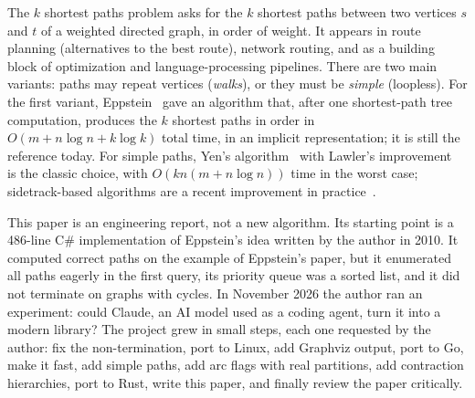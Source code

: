 \documentclass[11pt,a4paper]{article}
\newcommand{\cs}{C\#}
\begin{document}
The $k$ shortest paths problem asks for the $k$ shortest paths between two vertices $s$ and $t$ of a weighted
directed graph, in order of weight. It appears in route planning (alternatives to the best route), network routing,
and as a building block of optimization and language-processing pipelines. There are two main variants: paths may
repeat vertices (\emph{walks}), or they must be \emph{simple} (loopless). For the first variant,
Eppstein~\cite{eppstein1998} gave an algorithm that, after one shortest-path tree computation, produces the $k$
shortest paths in order in $O(m+n\log n+k\log k)$ total time, in an implicit representation; it is still the
reference today. For simple paths, Yen's algorithm~\cite{yen1971} with Lawler's improvement~\cite{lawler1972} is the
classic choice, with $O(kn(m+n\log n))$ time in the worst case; sidetrack-based algorithms are a recent
improvement in practice~\cite{kurz2016,alzoobi2023}.

This paper is an engineering report, not a new algorithm. Its starting point is a 486-line \cs{} implementation of
Eppstein's idea written by the author in 2010. It computed correct paths on the example of Eppstein's paper, but it
enumerated all paths eagerly in the first query, its priority queue was a sorted list, and it did not terminate on
graphs with cycles. In November 2026 the author ran an experiment: could Claude, an AI model used as a coding agent,
turn it into a modern library? The project grew in small steps, each one requested by the author: fix the
non-termination, port to Linux, add Graphviz output, port to Go, make it fast, add simple paths, add arc flags with
real partitions, add contraction hierarchies, port to Rust, write this paper, and finally review the paper
critically.
\end{document}
